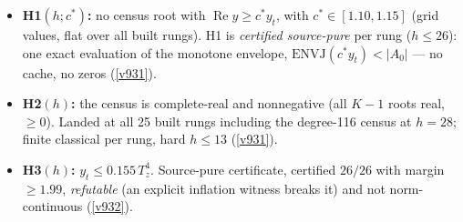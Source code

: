 \documentclass[11pt,a4paper]{article}
\begin{document}
\begin{itemize}
\item \textbf{H1$(h; c^*)$:} no census root with $\operatorname{Re} y \ge c^* y_t$, with
  $c^* \in [1.10, 1.15]$ (grid values, flat over all built rungs).  H1 is \emph{certified
  source-pure} per rung ($h \le 26$): one exact evaluation of the monotone envelope,
  $\mathrm{ENVJ}(c^* y_t) < |A_0|$ --- no cache, no zeros (\vref{v931}).
\item \textbf{H2$(h)$:} the census is complete-real and nonnegative (all $K{-}1$ roots real,
  $\ge 0$).  Landed at all 25 built rungs including the degree-116 census at $h = 28$; finite
  classical per rung, hard $h \le 13$ (\vref{v931}).
\item \textbf{H3$(h)$:} $y_t \le 0.155\,T_z^4$.  Source-pure certificate, certified $26/26$
  with margin $\ge 1.99$, \emph{refutable} (an explicit inflation witness breaks it) and not
  norm-continuous (\vref{v932}).
\end{itemize}
\end{document}
